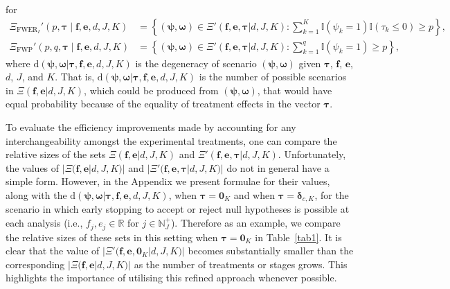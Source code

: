 \documentclass{article}
\numberwithin{equation}{section}
\theoremstyle{plain}
\begin{document}
for
\begin{align*}
\Xi_{\text{FWER}_I}'(p,\boldsymbol{\tau}\mid \boldsymbol{f},\boldsymbol{e},d,J,K) &= \left\{(\boldsymbol{\psi},\boldsymbol{\omega}) \in \Xi'(\boldsymbol{f},\boldsymbol{e},\boldsymbol{\tau}|d,J,K) : \sum_{k=1}^{K}\mathbb{I}(\psi_k = 1)\mathbb{I}(\tau_k \le 0) \ge p\right\},\\
\Xi_{\text{FWP}}'(p,q,\boldsymbol{\tau}\mid \boldsymbol{f},\boldsymbol{e},d,J,K) &= \left\{(\boldsymbol{\psi},\boldsymbol{\omega}) \in \Xi'(\boldsymbol{f},\boldsymbol{e},\boldsymbol{\tau}|d,J,K) : \sum_{k=1}^{q}\mathbb{I}(\psi_k = 1) \ge p\right\},
\end{align*}
where $\text{d}(\boldsymbol{\psi},\boldsymbol{\omega}|\boldsymbol{\tau},\boldsymbol{f},\boldsymbol{e},d,J,K)$ is the degeneracy of scenario $(\boldsymbol{\psi},\boldsymbol{\omega})$ given $\boldsymbol{\tau}$, $\boldsymbol{f}$, $\boldsymbol{e}$, $d$, $J$, and $K$. That is, $\text{d}(\boldsymbol{\psi},\boldsymbol{\omega}|\boldsymbol{\tau},\boldsymbol{f},\boldsymbol{e},d,J,K)$ is the number of possible scenarios in $\Xi(\boldsymbol{f},\boldsymbol{e}|d,J,K)$, which could be produced from $(\boldsymbol{\psi},\boldsymbol{\omega})$, that would have equal probability because of the equality of treatment effects in the vector $\boldsymbol{\tau}$.

To evaluate the efficiency improvements made by accounting for any interchangeability amongst the experimental treatments, one can compare the relative sizes of the sets $\Xi(\boldsymbol{f},\boldsymbol{e}|d,J,K)$ and $\Xi'(\boldsymbol{f},\boldsymbol{e},\boldsymbol{\tau}|d,J,K)$. Unfortunately, the values of $|\Xi(\boldsymbol{f},\boldsymbol{e}|d,J,K)|$ and $|\Xi'(\boldsymbol{f},\boldsymbol{e},\boldsymbol{\tau}|d,J,K)|$ do not in general have a simple form. However, in the Appendix we present formulae for their values, along with the $\text{d}(\boldsymbol{\psi},\boldsymbol{\omega}|\boldsymbol{\tau},\boldsymbol{f},\boldsymbol{e},d,J,K)$, when $\boldsymbol{\tau}=\boldsymbol{0}_K$ and when $\boldsymbol{\tau}=\boldsymbol{\delta}_{c,K}$, for the scenario in which early stopping to accept or reject null hypotheses is possible at each analysis (i.e., $f_j,e_j\in\mathbb{R}$ for $j\in\mathbb{N}_J^+$). Therefore as an example, we compare the relative sizes of these sets in this setting when $\boldsymbol{\tau}=\boldsymbol{0}_K$ in Table~\ref{tab1}. It is clear that the value of $|\Xi'(\boldsymbol{f},\boldsymbol{e},\boldsymbol{0}_K|d,J,K)|$ becomes substantially smaller than the corresponding  $|\Xi(\boldsymbol{f},\boldsymbol{e}|d,J,K)|$ as the number of treatments or stages grows. This highlights the importance of utilising this refined approach whenever possible.
	
\end{document}
